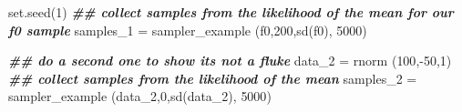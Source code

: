 \documentclass[
]{book}
\newenvironment{Shaded}{\begin{snugshade}}{\end{snugshade}}
\newcommand{\DecValTok}[1]{\textcolor[rgb]{0.00,0.00,0.81}{#1}}
\newcommand{\DocumentationTok}[1]{\textcolor[rgb]{0.56,0.35,0.01}{\textbf{\textit{#1}}}}
\newcommand{\FunctionTok}[1]{\textcolor[rgb]{0.00,0.00,0.00}{#1}}
\newcommand{\NormalTok}[1]{#1}
\newcommand{\OtherTok}[1]{\textcolor[rgb]{0.56,0.35,0.01}{#1}}
\newcommand{\SpecialCharTok}[1]{\textcolor[rgb]{0.00,0.00,0.00}{#1}}
\begin{document}
\begin{Shaded}
\begin{Highlighting}[]
\FunctionTok{set.seed}\NormalTok{(}\DecValTok{1}\NormalTok{)}
\DocumentationTok{\#\# collect samples from the likelihood of the mean for our f0 sample}
\NormalTok{samples\_1 }\OtherTok{=} \FunctionTok{sampler\_example}\NormalTok{ (f0,}\DecValTok{200}\NormalTok{,}\FunctionTok{sd}\NormalTok{(f0), }\DecValTok{5000}\NormalTok{)}

\DocumentationTok{\#\# do a second one to show its not a fluke}
\NormalTok{data\_2 }\OtherTok{=} \FunctionTok{rnorm}\NormalTok{ (}\DecValTok{100}\NormalTok{,}\SpecialCharTok{{-}}\DecValTok{50}\NormalTok{,}\DecValTok{1}\NormalTok{)}
\DocumentationTok{\#\# collect samples from the likelihood of the mean}
\NormalTok{samples\_2 }\OtherTok{=} \FunctionTok{sampler\_example}\NormalTok{ (data\_2,}\DecValTok{0}\NormalTok{,}\FunctionTok{sd}\NormalTok{(data\_2), }\DecValTok{5000}\NormalTok{)}


\end{Highlighting}
\end{Shaded}
\end{document}
